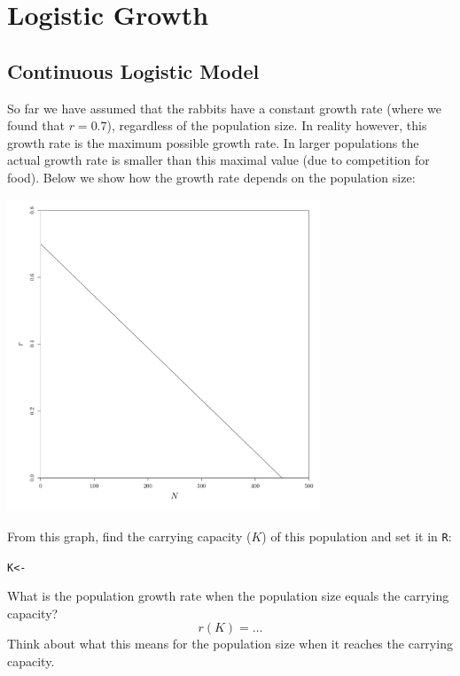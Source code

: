 \documentclass{article}\usepackage[]{graphicx}\usepackage[]{color}
\makeatletter
\newenvironment{kframe}{%
 \def\at@end@of@kframe{}%
 \ifinner\ifhmode%
  \def\at@end@of@kframe{\end{minipage}}%
  \begin{minipage}{\columnwidth}%
 \fi\fi%
 \def\FrameCommand##1{\hskip\@totalleftmargin \hskip-\fboxsep
 \colorbox{shadecolor}{##1}\hskip-\fboxsep
     \hskip-\linewidth \hskip-\@totalleftmargin \hskip\columnwidth}%
 \MakeFramed {\advance\hsize-\width
   \@totalleftmargin\z@ \linewidth\hsize
   \@setminipage}}%
 {\par\unskip\endMakeFramed%
 \at@end@of@kframe}
\newenvironment{knitrout}{}{} %
\makeatother
\begin{document}
\section{Logistic Growth}
\subsection{Continuous Logistic Model}
So far we have assumed that the rabbits have a constant growth rate (where we found that $r=0.7$), regardless of the population size. In reality however, this growth rate is the maximum possible growth rate. In larger populations the actual growth rate is smaller than this maximal value (due to competition for food). Below we show how the growth rate depends on the population size: 

\begin{knitrout}
\color{fgcolor}

{\centering \includegraphics[width=0.7\textwidth]{figure/k1-1} 

}



\end{knitrout}
From this graph, find the carrying capacity ($K$) of this population and set it in \texttt{R}:
\begin{knitrout}
\color{fgcolor}\begin{kframe}
\begin{alltt}
K <-
\end{alltt}
\end{kframe}
\end{knitrout}
What is the population growth rate when the population size equals the carrying capacity?
\begin{equation*}
r(K) = \dots
\end{equation*}
Think about what this means for the population size when it reaches the carrying capacity.
\end{document}
